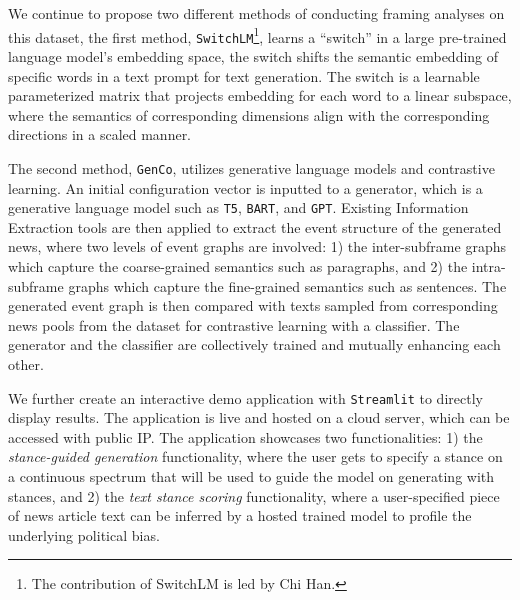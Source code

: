We continue to propose two different methods of conducting framing analyses on this dataset, the first method, \texttt{SwitchLM}\footnote{The contribution of SwitchLM is led by Chi Han.}, learns a ``switch'' in a large pre-trained language model's embedding space, the switch shifts the semantic embedding of specific words in a text prompt for text generation. The switch is a learnable parameterized matrix that projects embedding for each word to a linear subspace, where the semantics of corresponding dimensions align with the corresponding directions in a scaled manner.

The second method, \texttt{GenCo}, utilizes generative language models and contrastive learning. An initial configuration vector is inputted to a generator, which is a generative language model such as \texttt{T5}, \texttt{BART}, and \texttt{GPT}. Existing Information Extraction tools are then applied to extract the event structure of the generated news, where two levels of event graphs are involved: 1) the inter-subframe graphs which capture the coarse-grained semantics such as paragraphs, and 2) the intra-subframe graphs which capture the fine-grained semantics such as sentences. The generated event graph is then compared with texts sampled from corresponding news pools from the dataset for contrastive learning with a classifier. The generator and the classifier are collectively trained and mutually enhancing each other.

We further create an interactive demo application with \texttt{Streamlit} to directly display results. The application is live and hosted on a cloud server, which can be accessed with public IP. The application showcases two functionalities: 1) the \textit{stance-guided generation} functionality, where the user gets to specify a stance on a continuous spectrum that will be used to guide the model on generating with stances, and 2) the \textit{text stance scoring} functionality, where a user-specified piece of news article text can be inferred by a hosted trained model to profile the underlying political bias.